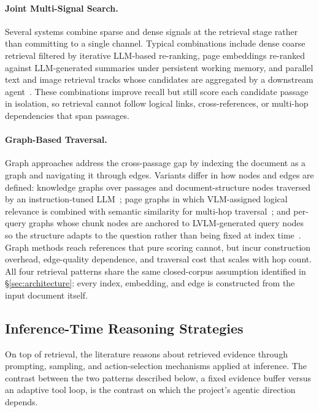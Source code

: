 \documentclass[11pt]{article}
\begin{document}
\paragraph{Joint Multi-Signal Search.}
Several systems combine sparse and dense signals at the retrieval stage rather than committing to a single channel. Typical combinations include dense coarse retrieval filtered by iterative LLM-based re-ranking, page embeddings re-ranked against LLM-generated summaries under persistent working memory, and parallel text and image retrieval tracks whose candidates are aggregated by a downstream agent~\cite{zhang2024cream,jain2025simpledoc,han2025mdocagent}. These combinations improve recall but still score each candidate passage in isolation, so retrieval cannot follow logical links, cross-references, or multi-hop dependencies that span passages.

\paragraph{Graph-Based Traversal.}
Graph approaches address the cross-passage gap by indexing the document as a graph and navigating it through edges. Variants differ in how nodes and edges are defined: knowledge graphs over passages and document-structure nodes traversed by an instruction-tuned LLM~\cite{wang2024knowledge}; page graphs in which VLM-assigned logical relevance is combined with semantic similarity for multi-hop traversal~\cite{wu2025molorag}; and per-query graphs whose chunk nodes are anchored to LVLM-generated query nodes so the structure adapts to the question rather than being fixed at index time~\cite{zhang2026mldocrag}. Graph methods reach references that pure scoring cannot, but incur construction overhead, edge-quality dependence, and traversal cost that scales with hop count. All four retrieval patterns share the same closed-corpus assumption identified in \S\ref{sec:architecture}: every index, embedding, and edge is constructed from the input document itself.

\subsection{Inference-Time Reasoning Strategies}
On top of retrieval, the literature reasons about retrieved evidence through prompting, sampling, and action-selection mechanisms applied at inference. The contrast between the two patterns described below, a fixed evidence buffer versus an adaptive tool loop, is the contrast on which the project's agentic direction depends.
\end{document}
